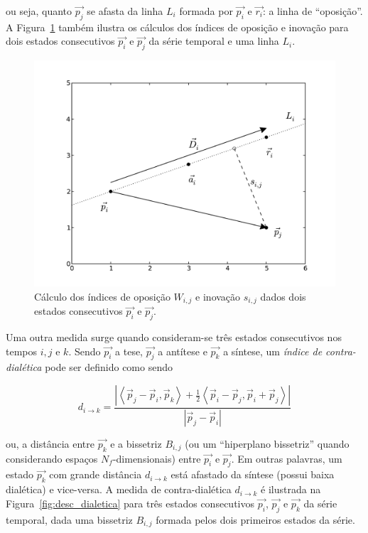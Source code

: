 \noindent ou seja, quanto $\vec{p_j}$ se afasta da linha $L_i$ formada por $\vec{p_i}$ e
$\vec{r_i}$: a linha de ``oposição''.  A Figura~\ref{fig:desc_opos_inov} também
ilustra os cálculos dos índices de oposição e inovação para dois estados
consecutivos $\vec{p_i}$ e $\vec{p_j}$ da série temporal e uma linha $L_i$.

\begin{figure}[ht!]
\begin{center}
        \includegraphics[scale=.6]{figs/desc_opos.pdf}
      \caption{Cálculo dos índices de oposição $W_{i,j}$ e inovação $s_{i,j}$
        dados dois estados consecutivos $\vec{p_i}$ e $\vec{p_j}$.}
        \label{fig:desc_opos_inov}
\end{center}
\end{figure}

Uma outra medida surge quando consideram-se três estados consecutivos nos tempos
$i,j$ e $k$. Sendo $\vec{p_i}$ a tese, $\vec{p_j}$ a antítese e $\vec{p_k}$ a
síntese, um \emph{índice de contra-dialética} pode ser definido como sendo


\begin{equation}
d_{i \rightarrow k} = 
      \frac{|\left< \vec{p}_j-\vec{p}_i,\vec{p}_k \right> + 
        \frac{1}{2}\left<\vec{p}_i-\vec{p}_j, \vec{p}_i+\vec{p}_j\right>|}
           {|\vec{p}_j-\vec{p}_i|}
\end{equation}

\noindent ou, a distância entre $\vec{p_k}$ e a bissetriz $B_{i,j}$ (ou um
``hiperplano bissetriz'' quando considerando espaços $N_f$-dimensionais) entre
$\vec{p_i}$ e $\vec{p_j}$. Em outras palavras, um estado $\vec{p_k}$ com grande distância $d_{i
  \rightarrow k}$ está afastado da síntese (possui baixa dialética) e
vice-versa. A medida de contra-dialética $d_{i \rightarrow k}$ é ilustrada na
Figura~\ref{fig:desc_dialetica} para três estados consecutivos $\vec{p_i}$,
$\vec{p_j}$ e $\vec{p_k}$ da série temporal, dada uma bissetriz $B_{i,j}$
formada pelos dois primeiros estados da série.

